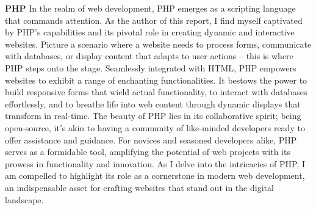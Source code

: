\newline
\newline
\textbf{PHP}
\newline
In the realm of web development, PHP emerges as a scripting language that commands attention. As the author of this report, I find myself captivated by PHP's capabilities and its pivotal role in creating dynamic and interactive websites. Picture a scenario where a website needs to process forms, communicate with databases, or display content that adapts to user actions – this is where PHP steps onto the stage. Seamlessly integrated with HTML, PHP empowers websites to exhibit a range of enchanting functionalities. It bestows the power to build responsive forms that wield actual functionality, to interact with databases effortlessly, and to breathe life into web content through dynamic displays that transform in real-time. The beauty of PHP lies in its collaborative spirit; being open-source, it's akin to having a community of like-minded developers ready to offer assistance and guidance. For novices and seasoned developers alike, PHP serves as a formidable tool, amplifying the potential of web projects with its prowess in functionality and innovation. As I delve into the intricacies of PHP, I am compelled to highlight its role as a cornerstone in modern web development, an indispensable asset for crafting websites that stand out in the digital landscape.
\newline
